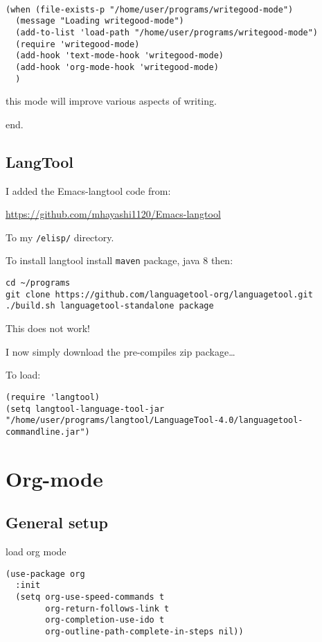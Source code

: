 \documentclass[12pt]{article}
\begin{document}
\begin{verbatim}

(when (file-exists-p "/home/user/programs/writegood-mode")
  (message "Loading writegood-mode")
  (add-to-list 'load-path "/home/user/programs/writegood-mode")
  (require 'writegood-mode)
  (add-hook 'text-mode-hook 'writegood-mode)
  (add-hook 'org-mode-hook 'writegood-mode)
  )
\end{verbatim}

this mode will improve various aspects of writing. 

end.


\subsection{LangTool}
\label{sec:org1401921}

I added the Emacs-langtool code from:

\url{https://github.com/mhayashi1120/Emacs-langtool}

To my \texttt{/elisp/} directory. 

To install langtool install \texttt{maven} package, java 8 then:

\begin{verbatim}
cd ~/programs
git clone https://github.com/languagetool-org/languagetool.git
./build.sh languagetool-standalone package

\end{verbatim}
This does not work! 

I now simply download the pre-compiles zip package\ldots{} 

To load: 
\begin{verbatim}
(require 'langtool)
(setq langtool-language-tool-jar "/home/user/programs/langtool/LanguageTool-4.0/languagetool-commandline.jar")
\end{verbatim}

\section{Org-mode}
\label{sec:org47caeac}
\subsection{General setup}
\label{sec:orga41f40f}

load org mode

\begin{verbatim}
(use-package org
  :init
  (setq org-use-speed-commands t
        org-return-follows-link t
        org-completion-use-ido t
        org-outline-path-complete-in-steps nil))
\end{verbatim}
\end{document}
